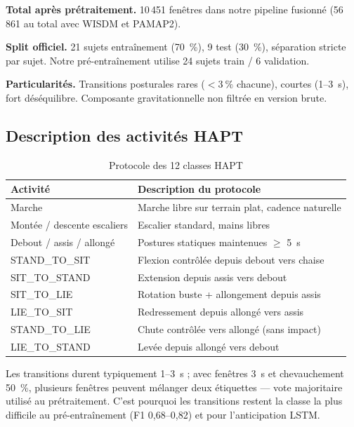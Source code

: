 \documentclass[a4paper,12pt]{report}
\begin{document}
\textbf{Total après prétraitement.} 10\,451 fenêtres dans notre pipeline fusionné
(56\,861 au total avec WISDM et PAMAP2).

\textbf{Split officiel.} 21 sujets entraînement (70~\%), 9 test (30~\%), séparation
stricte par sujet. Notre pré-entraînement utilise 24 sujets train / 6 validation.

\textbf{Particularités.} Transitions posturales rares ($< 3~\%$ chacune), courtes
(1--3~s), fort déséquilibre. Composante gravitationnelle non filtrée en version brute.

\subsection{Description des activités HAPT}

\begin{table}[H]
\centering
\small
\begin{tabularx}{\textwidth}{|>{\raggedright\arraybackslash}Y|Y|}
\hline
\textbf{Activité} & \textbf{Description du protocole} \\
\hline
Marche & Marche libre sur terrain plat, cadence naturelle \\
Montée / descente escaliers & Escalier standard, mains libres \\
Debout / assis / allongé & Postures statiques maintenues $\geq$ 5~s \\
STAND\_TO\_SIT & Flexion contrôlée depuis debout vers chaise \\
SIT\_TO\_STAND & Extension depuis assis vers debout \\
SIT\_TO\_LIE & Rotation buste + allongement depuis assis \\
LIE\_TO\_SIT & Redressement depuis allongé vers assis \\
STAND\_TO\_LIE & Chute contrôlée vers allongé (sans impact) \\
LIE\_TO\_STAND & Levée depuis allongé vers debout \\
\hline
\end{tabularx}
\caption{Protocole des 12 classes HAPT}
\label{tab:annexe_hapt_protocol}
\end{table}

Les transitions durent typiquement 1--3~s ; avec fenêtres 3~s et chevauchement
50~\%, plusieurs fenêtres peuvent mélanger deux étiquettes — vote majoritaire
utilisé au prétraitement. C'est pourquoi les transitions restent la classe la
plus difficile au pré-entraînement (F1 0,68--0,82) et pour l'anticipation LSTM.
\end{document}
